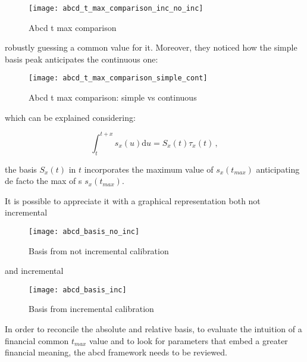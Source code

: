 \begin{figure}[H]
\centering
\texttt{[image: abcd\_t\_max\_comparison\_inc\_no\_inc]}
\caption{Abcd t max comparison}
\label{fig:abcd_t_max_comparison_inc_no_inc}
\end{figure}

robustly guessing a common value for it.
Moreover, they noticed how the simple basis peak anticipates the continuous one:

\begin{figure}[H]
\centering
\texttt{[image: abcd\_t\_max\_comparison\_simple\_cont]}
\caption{Abcd t max comparison: simple vs continuous}
\label{fig:abcd_t_max_comparison_simple_cont}
\end{figure}

which can be explained considering:

\begin{equation}
\int_t^{t+x} s_x(u) \mathrm{d}u = S_x(t) \tau_x(t)\,,
\end{equation}

the basis $ S_x(t)$ in $t$ incorporates the maximum value of $s_x(t_{max})$ anticipating de facto the max of s $s_x(t_{max})$.

It is possible to appreciate it with a graphical representation both not incremental

\begin{figure}[H]
\centering
\texttt{[image: abcd\_basis\_no\_inc]}
\caption{Basis from not incremental calibration }
\label{fig:abcd_basis_no_inc}
\end{figure}

and incremental

\begin{figure}[H]
\centering
\texttt{[image: abcd\_basis\_inc]}
\caption{Basis from incremental calibration }
\end{figure}


In order to reconcile the absolute and relative basis, to evaluate the intuition of a financial common $t_{max}$ value and to look for parameters that embed a greater financial meaning, the abcd framework needs to be reviewed.